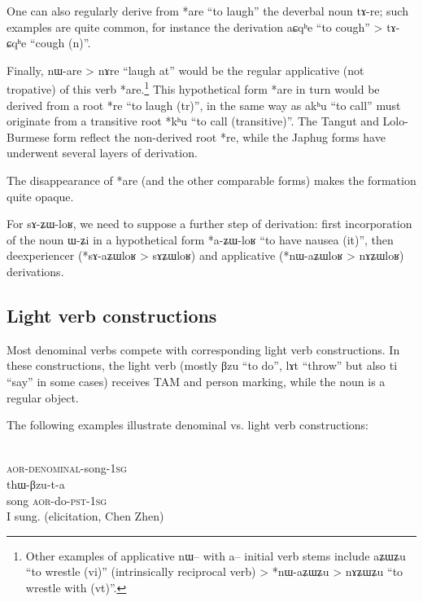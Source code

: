 \documentclass[oldfontcommands,oneside,a4paper,11pt]{article}
\newcommand{\ipa}[1]{{\phon #1}} %
\newcommand{\aor}{\textsc{aor}}
\newcommand{\pst}{\textsc{pst}}
\newcommand{\sg}{\textsc{sg}}
\begin{document}
	One can also regularly derive from *are ``to laugh'' the deverbal noun \ipa{tɤ-re}; such  examples are quite common, for instance  the derivation \ipa{aɕqʰe} ``to cough'' > \ipa{tɤ-ɕqʰe} ``cough (n)''.
	
	
	Finally,  \ipa{nɯ-are} > \ipa{nɤre} ``laugh at'' would be the regular applicative (not tropative) of this verb *are.\footnote{Other examples of applicative \ipa{nɯ}-- with \ipa{a}-- initial verb stems include \ipa{aʑɯʑu} ``to wrestle (vi)'' (intrinsically reciprocal verb) > *nɯ-aʑɯʑu > \ipa{nɤʑɯʑu} ``to wrestle with (vt)''.} This hypothetical form *are in turn would be derived from a root *re ``to laugh (tr)'', in the same way as \ipa{akʰu} ``to call'' must originate from a transitive root *kʰu ``to call (transitive)''. The Tangut and Lolo-Burmese form reflect the non-derived root *re, while the Japhug forms have underwent several layers of derivation.
	
	The disappearance of *are (and the other comparable forms) makes the formation quite opaque. 
	
	
	For \ipa{sɤ-ʑɯ-loʁ}, we need to suppose a further step of derivation: first incorporation of the noun \ipa{ɯ-ʑi} in a hypothetical form *a-ʑɯ-loʁ ``to have nausea (it)'', then deexperiencer (*sɤ-aʑɯloʁ > \ipa{sɤʑɯloʁ}) and applicative (*nɯ-aʑɯloʁ > \ipa{nɤʑɯloʁ}) derivations.

\subsection{Light verb constructions}

Most denominal verbs compete with corresponding light verb constructions. In these constructions, the light verb (mostly \ipa{βzu} ``to do'', \ipa{lɤt} ``throw'' but also \ipa{ti} ``say'' in some cases) receives TAM and person marking, while the noun is a regular object.


The following examples illustrate denominal vs. light verb constructions:

 \begin{exe}
\ex
\begin{xlist}[(ii)]
\gll    \ipa{thɯ-nɯ-rɤɣo-a}	 \\
 \aor{}-\textsc{denominal}-song-1\sg{} \\
 \gll    \ipa{rɤɣo} \ipa{thɯ-βzu-t-a}	 \\
 song \aor{}-do-\pst{}-1\sg{} \\
 \glt  I sung. (elicitation, Chen Zhen)
 
 \end{xlist}
\end{exe} 
\end{document}
